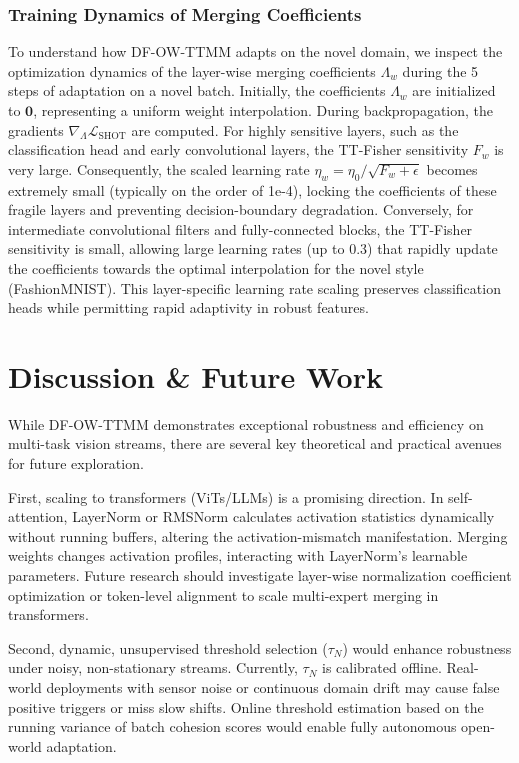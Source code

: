 \documentclass{article}
\theoremstyle{plain}
\theoremstyle{definition}
\theoremstyle{remark}
\begin{document}
\subsubsection{Training Dynamics of Merging Coefficients}
To understand how DF-OW-TTMM adapts on the novel domain, we inspect the optimization dynamics of the layer-wise merging coefficients $\Lambda_w$ during the 5 steps of adaptation on a novel batch. Initially, the coefficients $\Lambda_w$ are initialized to $\mathbf{0}$, representing a uniform weight interpolation. During backpropagation, the gradients $\nabla_{\Lambda} \mathcal{L}_{\text{SHOT}}$ are computed. For highly sensitive layers, such as the classification head and early convolutional layers, the TT-Fisher sensitivity $F_w$ is very large. Consequently, the scaled learning rate $\eta_w = \eta_0 / \sqrt{F_w + \epsilon}$ becomes extremely small (typically on the order of 1e-4), locking the coefficients of these fragile layers and preventing decision-boundary degradation. Conversely, for intermediate convolutional filters and fully-connected blocks, the TT-Fisher sensitivity is small, allowing large learning rates (up to 0.3) that rapidly update the coefficients towards the optimal interpolation for the novel style (FashionMNIST). This layer-specific learning rate scaling preserves classification heads while permitting rapid adaptivity in robust features.

\section{Discussion \& Future Work}
While DF-OW-TTMM demonstrates exceptional robustness and efficiency on multi-task vision streams, there are several key theoretical and practical avenues for future exploration.

First, scaling to transformers (ViTs/LLMs) is a promising direction. In self-attention, LayerNorm or RMSNorm calculates activation statistics dynamically without running buffers, altering the activation-mismatch manifestation. Merging weights changes activation profiles, interacting with LayerNorm's learnable parameters. Future research should investigate layer-wise normalization coefficient optimization or token-level alignment to scale multi-expert merging in transformers.

Second, dynamic, unsupervised threshold selection ($\tau_N$) would enhance robustness under noisy, non-stationary streams. Currently, $\tau_N$ is calibrated offline. Real-world deployments with sensor noise or continuous domain drift may cause false positive triggers or miss slow shifts. Online threshold estimation based on the running variance of batch cohesion scores would enable fully autonomous open-world adaptation.
\end{document}
